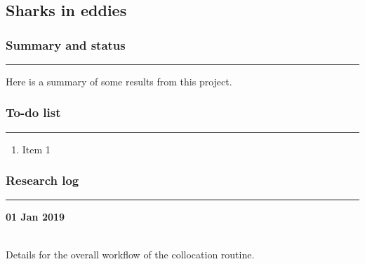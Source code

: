 \clearpage
\chapter{}
\section{Sharks in eddies}

\subsection*{Summary and status}
\hrule
Here is a summary of some results from this project.


\subsection*{To-do list}
\hrule

\begin{enumerate}
\item Item 1
\end{enumerate}


\subsection*{Research log}
\hrule
\vspace{10pt}

\begin{large} \textbf{01 Jan 2019} \end{large} \hrulefill
\\
Details for the overall workflow of the collocation routine.

